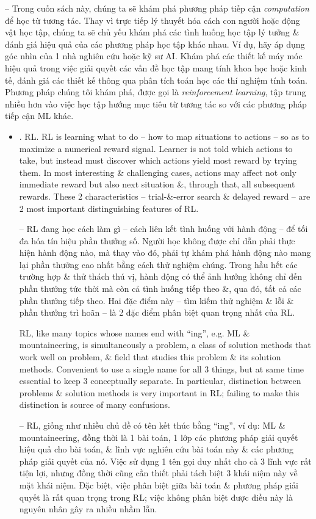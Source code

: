 \documentclass{article}
\begin{document}
\begin{itemize}
    -- Trong cuốn sách này, chúng ta sẽ khám phá phương pháp tiếp cận {\it computation} để học từ tương tác. Thay vì trực tiếp lý thuyết hóa cách con người hoặc động vật học tập, chúng ta sẽ chủ yếu khám phá các tình huống học tập lý tưởng \& đánh giá hiệu quả của các phương pháp học tập khác nhau. Ví dụ, hãy áp dụng góc nhìn của 1 nhà nghiên cứu hoặc kỹ sư AI. Khám phá các thiết kế máy móc hiệu quả trong việc giải quyết các vấn đề học tập mang tính khoa học hoặc kinh tế, đánh giá các thiết kế thông qua phân tích toán học các thí nghiệm tính toán. Phương pháp chúng tôi khám phá, được gọi là {\it reinforcement learning}, tập trung nhiều hơn vào việc học tập hướng mục tiêu từ tương tác so với các phương pháp tiếp cận ML khác.
    \begin{itemize}
        \item {. RL.} RL is learning what to do -- how to map situations to actions -- so as to maximize a numerical reward signal. Learner is not told which actions to take, but instead must discover which actions yield most reward by trying them. In most interesting \& challenging cases, actions may affect not only immediate reward but also next situation \&, through that, all subsequent rewards. These 2 characteristics -- trial-\&-error search \& delayed reward -- are 2 most important distinguishing features of RL.

        -- RL đang học cách làm gì -- cách liên kết tình huống với hành động -- để tối đa hóa tín hiệu phần thưởng số. Người học không được chỉ dẫn phải thực hiện hành động nào, mà thay vào đó, phải tự khám phá hành động nào mang lại phần thưởng cao nhất bằng cách thử nghiệm chúng. Trong hầu hết các trường hợp \& thử thách thú vị, hành động có thể ảnh hưởng không chỉ đến phần thưởng tức thời mà còn cả tình huống tiếp theo \&, qua đó, tất cả các phần thưởng tiếp theo. Hai đặc điểm này -- tìm kiếm thử nghiệm \& lỗi \& phần thưởng trì hoãn -- là 2 đặc điểm phân biệt quan trọng nhất của RL.

        RL, like many topics whose names end with ``ing'', e.g. ML \& mountaineering, is simultaneously a problem, a class of solution methods that work well on problem, \& field that studies this problem \& its solution methods. Convenient to use a single name for all 3 things, but at same time essential to keep 3 conceptually separate. In particular, distinction between problems \& solution methods is very important in RL; failing to make this distinction is source of many confusions.

        -- RL, giống như nhiều chủ đề có tên kết thúc bằng ``ing'', ví dụ: ML \& mountaineering, đồng thời là 1 bài toán, 1 lớp các phương pháp giải quyết hiệu quả cho bài toán, \& lĩnh vực nghiên cứu bài toán này \& các phương pháp giải quyết của nó. Việc sử dụng 1 tên gọi duy nhất cho cả 3 lĩnh vực rất tiện lợi, nhưng đồng thời cũng cần thiết phải tách biệt 3 khái niệm này về mặt khái niệm. Đặc biệt, việc phân biệt giữa bài toán \& phương pháp giải quyết là rất quan trọng trong RL; việc không phân biệt được điều này là nguyên nhân gây ra nhiều nhầm lẫn.


\end{itemize}
\end{itemize}
\end{document}
